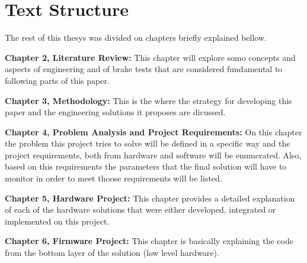 	\section{Text Structure}\label{sec:text-structure}
	
	The rest of this thesys was divided on chapters briefly explained bellow.
	
	\textbf{Chapter 2, Literature Review: } This chapter will explore somo concepts and aspects of engineering and of brake tests that are considered fundamental to following parts of this paper.
	\par
	
	\textbf{Chapter 3, Methodology: }
	This is the where the strategy for developing this paper and the engineering solutions it proposes are dicussed.
	\par
	
	\textbf{Chapter 4, Problem Analysis and Project Requirements: }
	On this chapter the problem this project tries to solve will be defined in a specific way and the project requirements, both from hardware and software will be enumerated. Also, based on this requirements the parameters that the final solution will have to monitor in order to meet thoose requirements will be listed.
	\par
	
	\textbf{Chapter 5, Hardware Project: }
	This chapter provides a detailed explanation of each of the hardware solutions that were either developed, integrated or implemented on this project.
	\par
	
	\textbf{Chapter 6, Firmware Project: }
	This chapter is basically explaining the code from the bottom layer of the solution (low level hardware).